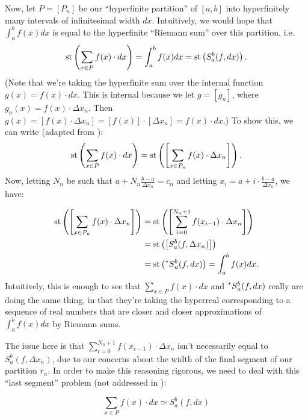 Now, let $P = [P_n]$ be our ``hyperfinite partition'' of $[a,b]$ into hyperfinitely many intervals of infinitesimal width $dx$. Intuitively, we would hope that $\int_a^b f(x)dx$ is equal to the hyperfinite ``Riemann sum'' over this partition, i.e.
\[
\operatorname{st}\left(\sum_{x \in P} f(x) \cdot dx\right) = \int_a^b f(x)dx = \operatorname{st}\left(S_a^b(f, dx)\right).
\]
(Note that we're taking the hyperfinite sum over the internal function $g(x) = f(x) \cdot dx$. This is internal because we let $g = [g_n]$, where $g_n(x) = f(x) \cdot \Delta x_n$. Then $g(x) = [f(x) \cdot \Delta x_n] = [f(x)] \cdot [\Delta x_n] = f(x) \cdot dx$.) To show this, we can write (adapted from \cite[Chapter~12.7]{goldblatt1998}):
\[
\operatorname{st}\left(\sum_{x \in P} f(x) \cdot dx \right)= \operatorname{st}\left(\left[\sum_{x \in P_n} f(x) \cdot \Delta x_n\right]\right) .
\]
Now, letting $N_n$ be such that $a + N_n \frac{b-a}{\Delta x_n} = c_n$ and letting $x_i = a + i \cdot \frac{b-a}{\Delta x_n}$, we have:

\begin{align*}
\operatorname{st}\left(\left[\sum_{x \in P_n} f(x) \cdot \Delta x_n\right]\right) &= \operatorname{st}\left(\left[\sum_{i=0}^{N_n+1} f(x_{i-1}) \cdot \Delta x_n\right]\right) \\
    &= \operatorname{st}\left(\left[ S_a^b(f, \Delta x_n) \right]\right) \\
    &= \operatorname{st}\left(\prescript{*}{}{S}_a^b(f, dx)\right) = \int_a^b f(x)dx.
\end{align*}
Intuitively, this is enough to see that $\sum_{x \in P} f(x) \cdot dx$ and $\prescript{*}{}{S}_a^b(f, dx)$ really are doing the same thing, in that they're taking the hyperreal corresponding to a sequence of real numbers that are closer and closer approximations of $\int_a^b f(x)dx$ by Riemann sums. 

The issue here is that $\sum_{i=0}^{N_n+1} f(x_{i-1}) \cdot \Delta x_n$ isn't necessarily equal to $S_a^b(f, \Delta x_n)$, due to our concerns about the width of the final segment of our partition $r_n$. In order to make this reasoning rigorous, we need to deal with this ``last segment'' problem (not addressed in \cite{goldblatt1998}):

\begin{thm}
    \[ \sum_{x \in P} f(x) \cdot dx \simeq S_a^b(f, dx) \]
\end{thm}

